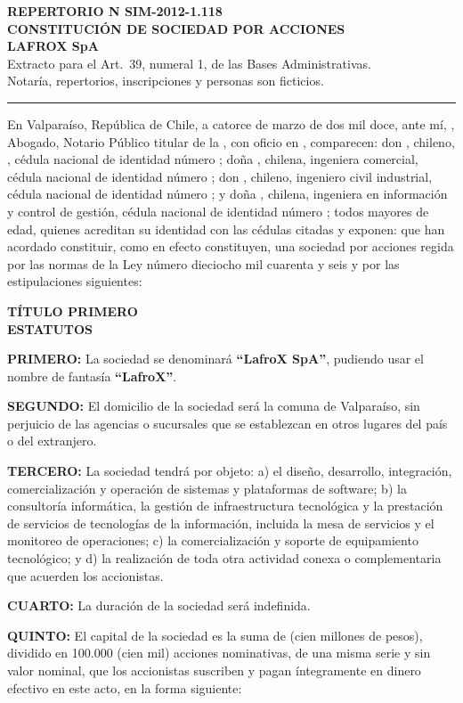 \documentclass[10pt]{article}
\newcommand{\clau}[2]{\par\needspace{4\baselineskip}\textbf{#1:} #2\par}
\newcommand{\encab}[2]{\begin{center}\bfseries #1\\[2pt] #2\end{center}}
\begin{document}
\begin{center}
\textbf{REPERTORIO N\textdegree{} SIM-2012-1.118}\\[6pt]
\textbf{CONSTITUCIÓN DE SOCIEDAD POR ACCIONES}\\
\textbf{LAFROX SpA}\\[6pt]
{\small Extracto para el Art.~39\textdegree, numeral 1, de las Bases Administrativas.\\Notaría, repertorios, inscripciones y personas son ficticios.}
\end{center}
\hrule\vspace{6pt}

En Valparaíso, República de Chile, a catorce de marzo de dos mil doce, ante mí, \textbf{\MakeUppercase{\SIMnotarioTitular}}, Abogado, Notario Público titular de la \SIMnotaria, con oficio en \SIMnotariaDir, comparecen: don \textbf{\SIMsocioAnombre}, chileno, \SIMprofesion, cédula nacional de identidad número \SIMsocioArun; doña \textbf{\SIMsocioBnombre}, chilena, ingeniera comercial, cédula nacional de identidad número \SIMsocioBrun; don \textbf{\SIMsocioCnombre}, chileno, ingeniero civil industrial, cédula nacional de identidad número \SIMsocioCrun; y doña \textbf{\SIMsocioDnombre}, chilena, ingeniera en información y control de gestión, cédula nacional de identidad número \SIMsocioDrun; todos mayores de edad, quienes acreditan su identidad con las cédulas citadas y exponen: que han acordado constituir, como en efecto constituyen, una sociedad por acciones regida por las normas de la Ley número dieciocho mil cuarenta y seis y por las estipulaciones siguientes:

\encab{TÍTULO PRIMERO}{ESTATUTOS}

\clau{PRIMERO}{La sociedad se denominará \textbf{``LafroX SpA''}, pudiendo usar el nombre de fantasía \textbf{``LafroX''}.}
\clau{SEGUNDO}{El domicilio de la sociedad será la comuna de Valparaíso, sin perjuicio de las agencias o sucursales que se establezcan en otros lugares del país o del extranjero.}
\clau{TERCERO}{La sociedad tendrá por objeto: a) el diseño, desarrollo, integración, comercialización y operación de sistemas y plataformas de software; b) la consultoría informática, la gestión de infraestructura tecnológica y la prestación de servicios de tecnologías de la información, incluida la mesa de servicios y el monitoreo de operaciones; c) la comercialización y soporte de equipamiento tecnológico; y d) la realización de toda otra actividad conexa o complementaria que acuerden los accionistas.}
\clau{CUARTO}{La duración de la sociedad será indefinida.}
\clau{QUINTO}{El capital de la sociedad es la suma de \SIMcapitalinicial{} (cien millones de pesos), dividido en 100.000 (cien mil) acciones nominativas, de una misma serie y sin valor nominal, que los accionistas suscriben y pagan íntegramente en dinero efectivo en este acto, en la forma siguiente:}
\end{document}
